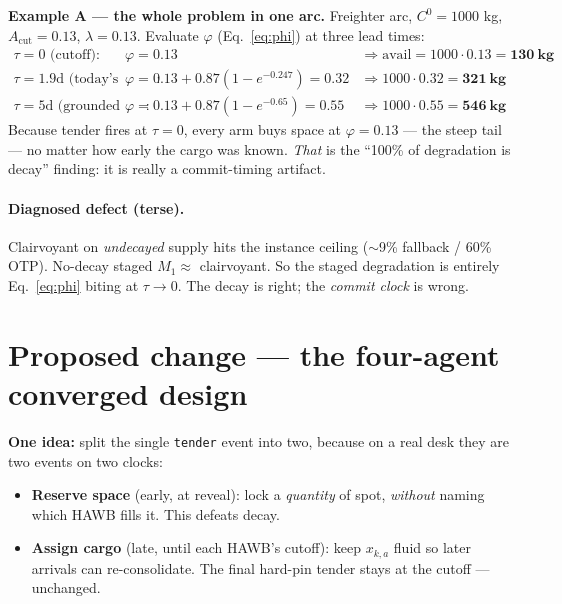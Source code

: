 \documentclass[11pt]{article}
\newcommand{\Acut}{A_{\mathrm{cut}}}
\newcommand{\Cz}{C^{0}}
\newcommand{\avail}{\mathrm{avail}}
\newcommand{\code}[1]{\texttt{#1}}
\begin{document}
\begin{mdframed}[backgroundcolor=blue!4,linewidth=0.4pt]
\textbf{Example A --- the whole problem in one arc.} Freighter arc, $\Cz=1000$ kg, $\Acut=0.13$,
$\lambda=0.13$. Evaluate $\varphi$ (Eq.~\ref{eq:phi}) at three lead times:
\[
\begin{array}{lll}
\tau=0 \text{ (cutoff)} : & \varphi=0.13 & \Rightarrow \avail = 1000\cdot0.13 = \mathbf{130\ kg}\\
\tau=1.9\text{d (today's reveal)} : & \varphi=0.13+0.87(1-e^{-0.247})=0.32 & \Rightarrow 1000\cdot0.32=\mathbf{321\ kg}\\
\tau=5\text{d (grounded reveal)} : & \varphi=0.13+0.87(1-e^{-0.65})=0.55 & \Rightarrow 1000\cdot0.55=\mathbf{546\ kg}
\end{array}
\]
Because tender fires at $\tau=0$, every arm buys space at $\varphi=0.13$ --- the steep tail --- no matter
how early the cargo was known. \emph{That} is the ``100\% of degradation is decay'' finding: it is really
a commit-timing artifact.
\end{mdframed}

\paragraph{Diagnosed defect (terse).} Clairvoyant on \emph{undecayed} supply hits the instance ceiling
($\sim$9\% fallback / 60\% OTP). No-decay staged $M_1\approx$ clairvoyant. So the staged degradation is
entirely Eq.~\eqref{eq:phi} biting at $\tau\!\to\!0$. The decay is right; the \emph{commit clock} is wrong.

\section{Proposed change --- the four-agent converged design}\label{sec:proposal}

\noindent\textbf{One idea:} split the single \code{tender} event into two, because on a real desk they
are two events on two clocks:
\begin{itemize}[leftmargin=1.4em,itemsep=1pt]
\item \textbf{Reserve space} (early, at reveal): lock a \emph{quantity} of spot, \emph{without} naming which
HAWB fills it. This defeats decay.
\item \textbf{Assign cargo} (late, until each HAWB's cutoff): keep $x_{k,a}$ fluid so later arrivals can
re-consolidate. The final hard-pin tender stays at the cutoff --- unchanged.
\end{itemize}
\end{document}
